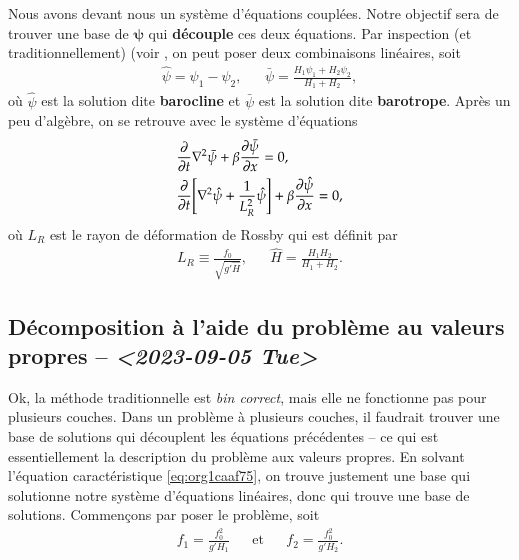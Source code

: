 \documentclass[10pt]{article}
\numberwithin{equation}{section}
\begin{document}
Nous avons devant nous un système d'équations couplées.
Notre objectif sera de trouver une base de \(\boldsymbol{\psi}\) qui \textbf{découple} ces deux équations.
Par inspection (et traditionnellement) (voir \citep[p.230]{vallis_2006}, on peut poser deux combinaisons linéaires, soit
\begin{align}
   &&\hat{\psi} = \psi_1 - \psi_2 ,&& \bar{\psi} = \frac{H_1\psi_1 + H_2\psi_2}{H_1+H_2}, &&
\end{align}
où \(\hat{\psi}\) est la solution dite \textbf{barocline} et \(\bar{\psi}\) est la solution dite \textbf{barotrope}.
Après un peu d'algèbre, on se retrouve avec le système d'équations
\begin{subequations}
\begin{align}
   &\pdv{}{t} \laplacian\bar{\psi} + \beta \pdv{\bar{\psi}}{x} = 0,\\
   &\pdv{}{t} \qty[\laplacian\hat{\psi} + \frac{1}{L_R^2}\hat{\psi}] + \beta \pdv{\hat{\psi}}{x} = 0,
\end{align}
\end{subequations}
où \(L_R\) est le rayon de déformation de Rossby qui est définit par
\begin{align}
   && L_R \equiv \frac{f_0}{\sqrt{g'\hat{H}}}, && \hat{H} = \frac{H_1H_2}{H_1+H_2}.&&
\end{align}

\subsection{Décomposition à l'aide du problème au valeurs propres -- \textit{<2023-09-05 Tue>}}
\label{sec:orgdefab41}

Ok, la méthode traditionnelle est \emph{bin correct}, mais elle ne fonctionne pas pour plusieurs couches.
Dans un problème à plusieurs couches, il faudrait trouver une base de solutions qui découplent les équations précédentes -- ce qui est essentiellement la description du problème aux valeurs propres.
En solvant l'équation caractéristique \ref{eq:org1caaf75}, on trouve justement une base qui solutionne notre système d'équations linéaires, donc qui trouve une base de solutions.
Commençons par poser le problème, soit
\begin{align}
   && f_1 = \frac{f_0^2}{g'H_1} && \text{et} && f_2 = \frac{f_0^2}{g'H_2}. &&
\end{align}
\end{document}
